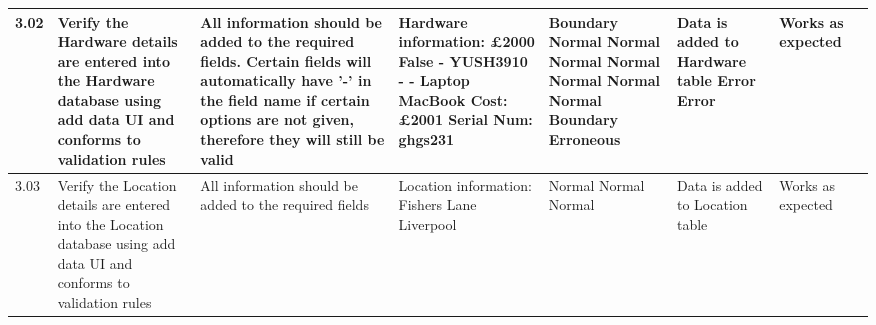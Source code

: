 \begin{landscape}
\begin{center}
\begin{longtable}{|p{1.5cm}|p{2cm}|p{2.5cm}|p{2cm}|p{2cm}|p{2cm}|p{3cm}|p{1.7cm}|}
3.02 & Verify the Hardware details are entered into the Hardware database using add data UI and conforms to validation rules & All information should be added to the required fields. Certain fields will automatically have '-' in the field name if certain options are not given, therefore they will still be valid &Hardware information: \newline £2000 \newline False \newline - \newline YUSH3910 \newline -  \newline - \newline Laptop \newline MacBook \newline \newline Cost: £2001 \newline Serial Num: ghgs231 & \newline \newline Boundary \newline Normal \newline Normal \newline Normal \newline Normal \newline Normal \newline Normal \newline Normal \newline \newline Boundary \newline Erroneous & Data is added to Hardware table  \newline \newline \newline \newline \newline \newline \newline    \newline  Error \newline Error  &Works as expected& \\ \hline
3.03 & Verify the Location details are entered into the Location database using add data UI and conforms to validation rules & All information should be added to the required fields  &Location information: \newline 25 \newline Fishers Lane \newline Liverpool & \newline  \newline  Normal \newline Normal \newline Normal& Data is added to Location table &Works as expected& \\ \hline

\end{longtable}
\end{center}
\end{landscape}
